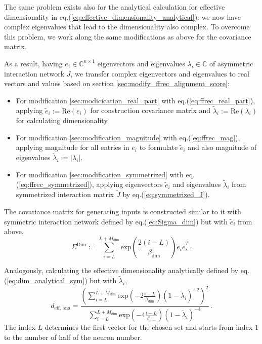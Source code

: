 \documentclass[11pt]{article}
\begin{document}
	The same problem exists also for the analytical calculation for effective dimensionality in  eq.(\ref{eq:effective_dimensionality_analytical}): we now have complex eigenvalues that lead to the dimensionality also complex. To overcome this problem, we work along the same modifications as above for the covariance matrix.
				  
	As a result, having $e_i \in \mathbb{C}^{n \times 1}$ eigenvectors and eigenvalues $\lambda_i \in \mathbb{C}$ of asymmetric interaction network $J$, we transfer complex eigenvectors and eigenvalues to real vectors and values based on section \ref{sec:modify_ffrec_alignment_score}: 
	  \begin{itemize}
			  	\item For modification \ref{sec:modicication_real_part} with eq.(\ref{eq:ffrec_real_part}), applying $\tilde{e}_i := \text{Re}(e_i)$ for construction covariance matrix and $\tilde{\lambda}_i := \text{Re}(\lambda_i)$ for calculating dimensionality.
			  	\item For modification \ref{sec:modification_magnitude} with eq.(\ref{eq:ffrec_mag}), applying magnitude for all entries in $e_i$ to formulate $\tilde{e}_i$ and  also magnitude of eigenvalues $\tilde{\lambda}_i := \vert \lambda_i \vert$. 
			  	\item For modification \ref{sec:modification_symmetrized} with eq.(\ref{eq:ffrec_symmetrized}), applying eigenvectors $\tilde{e}_i$ and eigenvalues $\tilde{\lambda}_i$ from symmetrized interaction matrix $\tilde{J}$ by  eq.(\ref{eq:symmetrized_J}).
	  \end{itemize}
			  		
  	 The covariance matrix for generating inputs is constructed similar to it with symmetric interaction network defined by  eq.(\ref{eq:Sigma_dim}) but with $\tilde{e}_i$ from above, 
  	  	\begin{equation} \label{eq:modifications_dim}
  	  		\Sigma^{\text{Dim}} := \sum_{i=L}^{L+M_{\text{dim}}} \text{exp}\left(\frac{2(i-L)}{\beta_{\text{dim}}}\right) \tilde{e}_i \tilde{e}_i^T \, .
  	  	\end{equation}
		  	  	
 	 Analogously, calculating the effective dimensionality analytically defined by eq.(\ref{eq:dim_analytical_sym}) but with $\tilde{\lambda}_i$,
  	  	  	\begin{equation} \label{eq:modification_eff_dim}
  	  	  		d_{\text{eff, ana}} = \frac{\left(\sum_{i = L}^{L + M_{\text{dim}}} \text{exp}\left(-2 \frac{i-L}{\beta_{\text{dim}}}\right)(1-\tilde{\lambda}_i)^{-2}\right)^2}{\sum_{i=L}^{L+M_{\text{dim}}} \text{exp}\left(-4 \frac{i-L}{\beta_{\text{dim}}}\right)(1-\tilde{\lambda}_i)^{-4}} \, .
  	  	  	\end{equation}
    The index $L$ determines the first vector for the chosen set and starts from index $1$ to the number of half of the neuron number.
		  	  	
\end{document}
